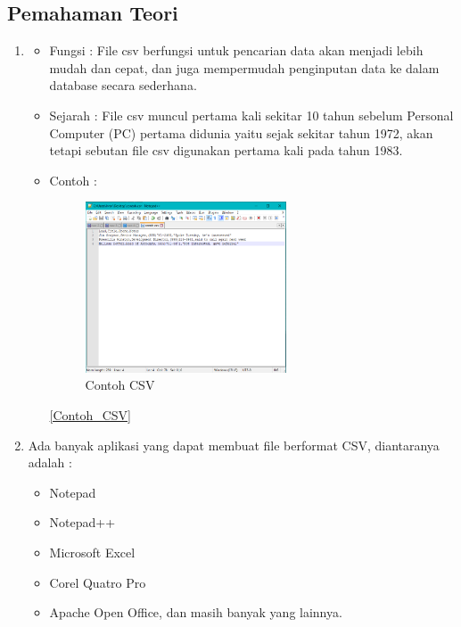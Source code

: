 	\subsection{Pemahaman Teori}
		\begin{enumerate}
			\item \begin{itemize}
					\item Fungsi : File csv berfungsi untuk pencarian data akan menjadi lebih mudah dan cepat, dan juga mempermudah penginputan data ke dalam database secara sederhana.
					\item Sejarah : File csv muncul pertama kali sekitar 10 tahun sebelum Personal Computer (PC) pertama  didunia yaitu sejak sekitar tahun 1972, akan tetapi sebutan file csv digunakan pertama kali pada tahun 1983.
					\item Contoh : 
						\begin{figure} [ht]
							\centerline{\includegraphics[width=0.6\textwidth]{figures/chapter4/Contoh_CSV.png}}
							\caption{Contoh CSV}
							\label{Contoh CSV}
						\end{figure}

					\ref{Contoh_CSV}
				\end{itemize}
			
			\item Ada banyak aplikasi yang dapat membuat file berformat CSV, diantaranya adalah :
				\begin{itemize}
					\item Notepad
					\item Notepad++
					\item Microsoft Excel
					\item Corel Quatro Pro
					\item Apache Open Office, dan masih banyak yang lainnya.
				\end{itemize}
			

\end{enumerate}
